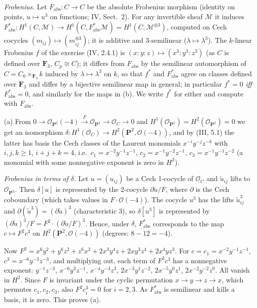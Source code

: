 \documentclass[11pt]{article}
\begin{document}
\emph{Frobenius.} Let $F_{\operatorname{abs}}\colon C\to C$ be the absolute Frobenius morphism (identity on points, $u\mapsto u^3$ on functions; IV, Sect.~2). For any invertible sheaf $\mathcal M$ it induces $F_{\operatorname{abs}}^*\colon H^1(C,\mathcal M)\to H^1(C,F^*_{\operatorname{abs}}\mathcal M)=H^1(C,\mathcal M^{\otimes3})$, computed on Cech cocycles $(m_{ij})\mapsto(m_{ij}^{\otimes3})$; it is additive and $3$-semilinear ($\lambda\mapsto\lambda^3$). The $k$-linear Frobenius $f$ of the exercise (IV, 2.4.1) is $(x:y:z)\mapsto(x^3:y^3:z^3)$ (as $C$ is defined over $\mathbf F_3$, $C_p\cong C$); it differs from $F_{\operatorname{abs}}$ by the semilinear automorphism of $C=C_0\times_{\mathbf F_3}k$ induced by $\lambda\mapsto\lambda^3$ on $k$, so that $f^*$ and $F^*_{\operatorname{abs}}$ agree on classes defined over $\mathbf F_3$ and differ by a bijective semilinear map in general; in particular \emph{$f^*=0$ iff $F^*_{\operatorname{abs}}=0$}, and similarly for the maps in (b). We write $f^*$ for either and compute with $F_{\operatorname{abs}}$.

(a) From $0\to\mathcal O_{\mathbf P^2}(-4)\xrightarrow{F}\mathcal O_{\mathbf P^2}\to\mathcal O_C\to0$ and $H^1(\mathcal O_{\mathbf P^2})=H^2(\mathcal O_{\mathbf P^2})=0$ we get an isomorphism $\delta\colon H^1(\mathcal O_C)\to H^2(\mathbf P^2,\mathcal O(-4))$, and by (III, 5.1) the latter has basis the Cech classes of the Laurent monomials $x^{-i}y^{-j}z^{-k}$ with $i,j,k\ge1$, $i+j+k=4$, i.e.\ $c_1=x^{-2}y^{-1}z^{-1}$, $c_2=x^{-1}y^{-2}z^{-1}$, $c_3=x^{-1}y^{-1}z^{-2}$ (a monomial with some nonnegative exponent is zero in $H^2$).

\emph{Frobenius in terms of $\delta$.} Let $u=(u_{ij})$ be a Cech 1-cocycle of $\mathcal O_C$ and $\tilde u_{ij}$ lifts to $\mathcal O_{\mathbf P^2}$. Then $\delta[u]$ is represented by the 2-cocycle $\partial\tilde u/F$, where $\partial$ is the Cech coboundary (which takes values in $F\cdot\mathcal O(-4)$). The cocycle $u^3$ has the lifts $\tilde u_{ij}^3$ and $\partial(\tilde u^3)=(\partial\tilde u)^3$ (characteristic 3), so $\delta[u^3]$ is represented by $(\partial\tilde u)^3/F=F^2\cdot(\partial\tilde u/F)^3$. Hence, under $\delta$, $F_{\operatorname{abs}}^*$ corresponds to the map $c\mapsto F^2c^3$ on $H^2(\mathbf P^2,\mathcal O(-4))$ (degrees: $8-12=-4$).

Now $F^2=x^6y^2+y^6z^2+z^6x^2+2x^3y^4z+2xy^3z^4+2x^4yz^3$. For $c=c_1=x^{-2}y^{-1}z^{-1}$, $c^3=x^{-6}y^{-3}z^{-3}$, and multiplying out, each term of $F^2c^3$ has a nonnegative exponent: $y^{-1}z^{-3}$, $x^{-6}y^{3}z^{-1}$, $x^{-4}y^{-3}z^{3}$, $2x^{-3}y^{1}z^{-2}$, $2x^{-5}y^{0}z^{1}$, $2x^{-2}y^{-2}z^{0}$. All vanish in $H^2$. Since $F$ is invariant under the cyclic permutation $x\to y\to z\to x$, which permutes $c_1,c_2,c_3$, also $F^2c_i^3=0$ for $i=2,3$. As $F^*_{\operatorname{abs}}$ is semilinear and kills a basis, it is zero. This proves (a).
\end{document}
